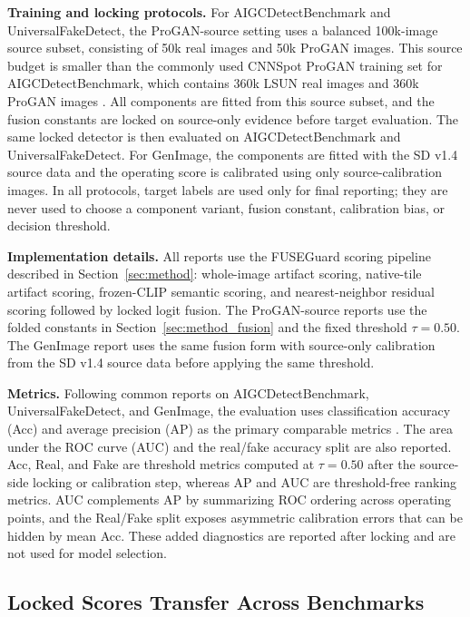 \documentclass[letterpaper,journal]{IEEEtran}
\begin{document}
\textbf{Training and locking protocols.}
For AIGCDetectBenchmark and UniversalFakeDetect, the ProGAN-source setting uses a balanced 100k-image source subset, consisting of 50k real images and 50k ProGAN images. This source budget is smaller than the commonly used CNNSpot ProGAN training set for AIGCDetectBenchmark, which contains 360k LSUN real images and 360k ProGAN images \cite{wang2020cnnspot,zhong2023patchcraft}. All components are fitted from this source subset, and the fusion constants are locked on source-only evidence before target evaluation. The same locked detector is then evaluated on AIGCDetectBenchmark and UniversalFakeDetect. For GenImage, the components are fitted with the SD v1.4 source data and the operating score is calibrated using only source-calibration images. In all protocols, target labels are used only for final reporting; they are never used to choose a component variant, fusion constant, calibration bias, or decision threshold.

\textbf{Implementation details.}
All reports use the FUSEGuard scoring pipeline described in Section~\ref{sec:method}: whole-image artifact scoring, native-tile artifact scoring, frozen-CLIP semantic scoring, and nearest-neighbor residual scoring followed by locked logit fusion. The ProGAN-source reports use the folded constants in Section~\ref{sec:method_fusion} and the fixed threshold $\tau=0.50$. The GenImage report uses the same fusion form with source-only calibration from the SD v1.4 source data before applying the same threshold.

\textbf{Metrics.}
Following common reports on AIGCDetectBenchmark, UniversalFakeDetect, and GenImage, the evaluation uses classification accuracy (Acc) and average precision (AP) as the primary comparable metrics \cite{ojha2023univfd,zhong2023patchcraft,zhu2023genimage,yan2025aide}. The area under the ROC curve (AUC) and the real/fake accuracy split are also reported. Acc, Real, and Fake are threshold metrics computed at $\tau=0.50$ after the source-side locking or calibration step, whereas AP and AUC are threshold-free ranking metrics. AUC complements AP by summarizing ROC ordering across operating points, and the Real/Fake split exposes asymmetric calibration errors that can be hidden by mean Acc. These added diagnostics are reported after locking and are not used for model selection.

\subsection{Locked Scores Transfer Across Benchmarks}
\label{sec:benchmark_reports}
\end{document}
